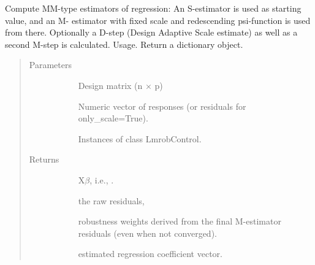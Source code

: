 \documentclass[letterpaper,10pt,english]{sphinxmanual}
\begin{document}
\begin{fulllineitems}
\label{\detokenize{_modules/lmrob:lmrob.lmrob_lar}}
Compute MM-type estimators of regression: An S-estimator is used as starting value, and an M-
estimator with fixed scale and redescending psi-function is used from there. Optionally a D-step
(Design Adaptive Scale estimate) as well as a second M-step is calculated.
Usage. Return a dictionary object.
\begin{quote}\begin{description}
\item[{Parameters}] \leavevmode\begin{description}
\item[{}] \leavevmode
Design matrix (n × p)

\item[{}] \leavevmode
Numeric vector of responses (or residuals for only\_scale=True).

\item[{}] \leavevmode
Instances of class LmrobControl.

\end{description}

\item[{Returns}] \leavevmode\begin{description}
\item[{}] \leavevmode
X\(\beta\), i.e., .

\item[{}] \leavevmode
the raw residuals, 

\item[{}] \leavevmode
robustness weights derived from the final M-estimator residuals (even when not
converged).

\item[{}] \leavevmode
{}

\item[{}] \leavevmode
estimated regression coefficient vector.


\end{description}
\end{description}
\end{quote}
\end{fulllineitems}
\end{document}
